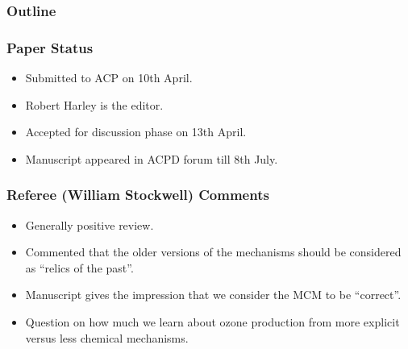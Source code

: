 \begin{frame}
    \frametitle{Outline} 
    \tableofcontents[currentsection]
\end{frame} 

\begin{frame}
    \frametitle{Paper Status}

    \vspace{-1cm}
    \begin{itemize}
        \item Submitted to ACP on 10th April. \vspace{5mm}
        \item Robert Harley is the editor.\vspace{5mm}
        \item Accepted for discussion phase on 13th April.\vspace{5mm}
        \item Manuscript appeared in ACPD forum till 8th July.
    \end{itemize}
\end{frame}

\begin{frame}
    \frametitle{Referee (William Stockwell) Comments}

    \vspace{-1cm}
    \begin{itemize}
        \item Generally positive review. \vspace{3mm}
        \item Commented that the older versions of the mechanisms should be considered as ``relics of the past''. \vspace{3mm}
        \item Manuscript gives the impression that we consider the MCM to be ``correct''. \vspace{3mm}
        \item Question on how much we learn about ozone production from more explicit versus less chemical mechanisms.
    \end{itemize}
\end{frame}

%
